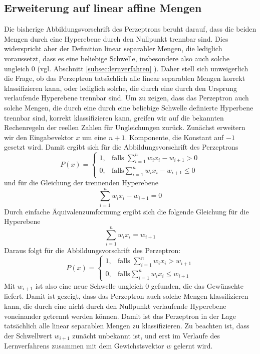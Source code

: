 \documentclass[fontsize=11pt]{scrartcl}
\begin{document}
            \subsection{Erweiterung auf linear affine Mengen}
                Die bisherige Abbildungsvorschrift des Perzeptrons beruht darauf, dass die beiden Mengen durch eine Hyperebene durch den Nullpunkt trennbar sind. Dies widerspricht aber der Definition linear separabler Mengen, die lediglich voraussetzt, dass es eine beliebige Schwelle, insbesondere also auch solche ungleich $0$ (vgl. Abschnitt \ref{subsec:lernverfahren} ). Daher stell sich unweigerlich die Frage, ob das Perzeptron tatsächlich alle linear separablen Mengen korrekt klassifizieren kann, oder lediglich solche, die durch eine durch den Ursprung verlaufende Hyperebene trennbar sind. Um zu zeigen, dass das Perzeptron auch solche Mengen, die durch eine durch eine beliebige Schwelle definierte Hyperbene trennbar sind, korrekt klassifizieren kann, greifen wir auf die bekannten Rechenregeln der reellen Zahlen für Ungleichungen zurück.
                Zunächst erweitern wir den Eingabevektor $x$ um eine $n+1$. Komponente, die Konstant auf $-1$ gesetzt wird.
                \newline 
                Damit ergibt sich für die Abbildungsvorschrift des Perzeptrons 
                $$
                    P(x)=\left\{\begin{array}{cl} 1, & \mbox{falls }\sum_{i=1}^nw_ix_i - w_{i+1} > 0\\ 0, & \mbox{falls} \sum_{i=1}^n w_ix_i - w_{i+1} \leq 0 \end{array}\right. 
                $$
                und für die Gleichung der trennenden Hyperebene
                $$
                    \sum_{i=1}^nw_ix_i - w_{i+1} = 0
                $$
                Durch einfache Äquivalenzumformung ergibt sich die folgende Gleichung für die Hyperebene
                    $$
                        \sum_{i=1}^nw_ix_i = w_{i+1}
                    $$
                    Daraus folgt für die Abbildungsvorschrift des Perzeptron:
                    $$
                    P(x)=\left\{\begin{array}{cl} 1, & \mbox{falls }\sum_{i=1}^nw_ix_i > w_{i+1}\\ 0, & \mbox{falls} \sum_{i=1}^n w_ix_i \leq w_{i+1} \end{array}\right. 
                    $$
                    Mit $w_{i+1}$ ist also eine neue Schwelle ungleich $0$ gefunden, die das Gewünschte liefert. Damit ist gezeigt, dass das Perzeptron auch solche Mengen klassifizieren kann, die durch eine nicht durch den Nullpunkt verlaufende Hyperebene voneinander getrennt werden können. Damit ist das Perzeptron in der Lage tatsächlich alle linear separablen Mengen zu klassifizieren.
                    \newline
                    Zu beachten ist, dass der Schwellwert $w_{i+1}$ zunächt unbekannt ist, und erst im Verlaufe des Lernverfahrens zusammen mit dem Gewichstsvektor $w$ gelernt wird.
\end{document}
